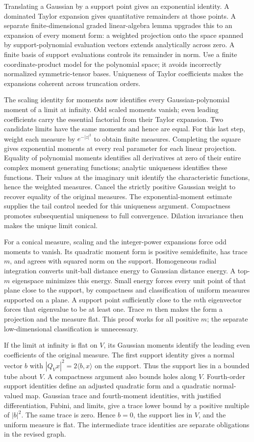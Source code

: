 Translating a Gaussian by a support point gives an exponential identity.
A dominated Taylor expansion gives quantitative remainders at those points.
A separate finite-dimensional graded linear-algebra lemma upgrades this to
an expansion of every moment form: a weighted projection onto the space
spanned by support-polynomial evaluation vectors extends analytically across
zero. A finite basis of support evaluations controls its remainder in norm.
Use a finite coordinate-product model for the polynomial space; it avoids
incorrectly normalized symmetric-tensor bases. Uniqueness of Taylor
coefficients makes the expansions coherent across truncation orders.

The scaling identity for moments now identifies every Gaussian-polynomial
moment of a limit at infinity. Odd scaled moments vanish; even leading
coefficients carry the essential factorial from their Taylor expansion.
Two candidate limits have the same moments and hence are equal. For this
last step, weight each measure by $e^{-|z|^2}$ to obtain finite measures.
Completing the square gives exponential moments at every real parameter
for each linear projection. Equality of polynomial moments identifies all
derivatives at zero of their entire complex moment generating functions;
analytic uniqueness identifies these functions. Their values at the
imaginary unit identify the characteristic functions, hence the weighted
measures. Cancel the strictly positive Gaussian weight to recover equality
of the original measures. The exponential-moment estimate supplies the
tail control needed for this uniqueness argument.
Compactness promotes subsequential uniqueness to full convergence. Dilation
invariance then makes the unique limit conical.

For a conical measure, scaling and the integer-power expansions force odd
moments to vanish. Its quadratic moment form is positive semidefinite, has
trace $m$, and agrees with squared norm on the support. Homogeneous radial
integration converts unit-ball distance energy to Gaussian distance energy.
A top-$m$ eigenspace minimizes this energy. Small energy forces every unit
point of that plane close to the support, by compactness and classification
of uniform measures supported on a plane. A support point sufficiently close
to the $m$th eigenvector forces that eigenvalue to be at least one. Trace $m$
then makes the form a projection and the measure flat. This proof works for
all positive $m$; the separate low-dimensional classification is unnecessary.

If the limit at infinity is flat on $V$, its Gaussian moments identify the
leading even coefficients of the original measure. The first support
identity gives a normal vector $b$ with
$|Q_Vx|^2=2\langle b,x\rangle$ on the support. Thus the support lies in a
bounded tube about $V$. A compactness argument also bounds holes along $V$.
Fourth-order support identities define an adjusted quadratic form and a
quadratic normal-valued map. Gaussian trace and fourth-moment identities,
with justified differentiation, Fubini, and limits, give a trace lower bound
by a positive multiple of $|b|^2$. The same trace is zero. Hence $b=0$,
the support lies in $V$, and the uniform measure is flat. The intermediate
trace identities are separate obligations in the revised graph.

